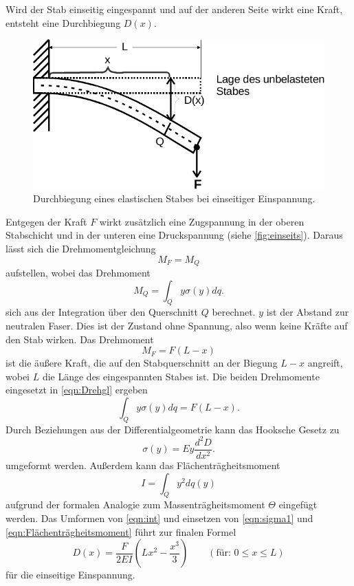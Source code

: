 Wird der Stab einseitig eingespannt und auf der anderen Seite wirkt eine Kraft, entsteht eine Durchbiegung $D(x)$.
\begin{figure}
  \centering
  \includegraphics{content/einseitig.pdf}
  \caption{Durchbiegung eines elastischen Stabes bei einseitiger Einspannung. \cite[107]{V103}}
  \label{fig:einseits}
\end{figure}
Entgegen der Kraft $F$ wirkt zusätzlich eine Zugspannung in der oberen Stabschicht und in der unteren eine Druckspannung (siehe \autoref{fig:einseits}). 
Daraus lässt sich die Drehmomentgleichung 
\begin{equation}
    M_F = M_Q
\label{eqn:Drehgl}
\end{equation}
aufstellen, wobei das Drehmoment 
\begin{equation}
    M_Q = \int_Q y \sigma(y) dq.
    \label{eqn:M_Q}
\end{equation}
sich aus der Integration über den Querschnitt $Q$ berechnet.
$y$ ist der Abstand zur neutralen Faser. Dies ist der Zustand ohne Spannung, also wenn keine Kräfte auf den Stab wirken.
Das Drehmoment
\begin{equation}
    M_F = F(L-x)
    \label{eqn:M_F}
\end{equation}
ist die äußere Kraft, die auf den Stabquerschnitt an der Biegung $L-x$ angreift, 
wobei $L$ die Länge des eingespannten Stabes ist.
Die beiden Drehmomente eingesetzt in \autoref{eqn:Drehgl} ergeben
\begin{equation}
  \int_Q y \sigma(y) dq = F(L-x).\label{eqn:int}
\end{equation}
Durch Beziehungen aus der Differentialgeometrie kann das Hooksche Gesetz zu
\begin{equation}
   \sigma(y) = E y \frac{d^2D}{dx^2}.\label{eqn:sigma1}
\end{equation}
umgeformt werden.
Außerdem kann das Flächenträgheitsmoment 
\begin{equation}
   I = \int_Q y^2dq(y)
   \label{eqn:Flächenträgheitsmoment}
\end{equation}
aufgrund der formalen Analogie zum Massenträgheitsmoment $\Theta$ eingefügt werden. \cite[109]{V103}
Das Umformen von \autoref{eqn:int} und einsetzen von \autoref{eqn:sigma1} und \autoref{eqn:Flächenträgheitsmoment} führt zur finalen Formel 
\begin{equation}
  D(x) = \frac{F}{2 E I}(Lx^2 - \frac{x^3}{3}) \qquad (\text{für: } 0 \leq x \leq L)
  \label{eqn:Biegung}
\end{equation}
für die einseitige Einspannung.

